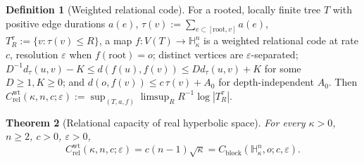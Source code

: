 \documentclass[11pt,reqno]{amsart}
\theoremstyle{plain}
\newtheorem{theorem}{Theorem}[section]
\theoremstyle{definition}
\newtheorem{definition}[theorem]{Definition}
\newcommand{\Crel}{C_{\mathrm{rel}}}
\newcommand{\Cblock}{C_{\mathrm{block}}}
\newcommand{\Hk}{\mathbb{H}^n_\kappa}
\newcommand{\eps}{\varepsilon}
\begin{document}
\begin{definition}[Weighted relational code]
For a rooted, locally finite tree $T$ with positive edge durations $a(e)$, $\tau(v):=\sum_{e\subset[\mathrm{root},v]}a(e)$, $T_R^\tau:=\{v:\tau(v)\le R\}$, a map $f:V(T)\to\Hk$ is a weighted relational code at rate $c$, resolution $\eps$ when $f(\mathrm{root})=o$; distinct vertices are $\eps$-separated; $D^{-1}d_\tau(u,v)-K\le d(f(u),f(v))\le Dd_\tau(u,v)+K$ for some $D\ge1,K\ge0$; and $d(o,f(v))\le c\,\tau(v)+A_0$ for depth-independent $A_0$. Then $\Crel^{\mathrm{wt}}(\kappa,n,c;\eps):=\sup_{(T,a,f)}\limsup_R R^{-1}\log|T_R^\tau|$.
\end{definition}

\begin{theorem}[Relational capacity of real hyperbolic space]\label{thm:relational}
For every $\kappa>0$, $n\ge2$, $c>0$, $\eps>0$,
\[
\Crel^{\mathrm{wt}}(\kappa,n,c;\eps)=c(n-1)\sqrt\kappa=\Cblock(\Hk,o;c,\eps).
\]
\end{theorem}
\end{document}
